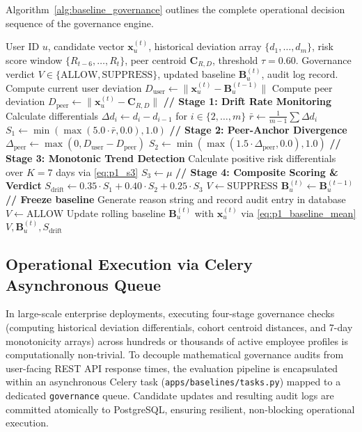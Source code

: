 \documentclass[conference]{IEEEtran}
\begin{document}
Algorithm~\ref{alg:baseline_governance} outlines the complete operational decision sequence of the governance engine.

\begin{algorithm}[t]
\caption{Four-Stage Baseline Update Governance Algorithm}
\label{alg:baseline_governance}
\begin{algorithmic}[1]
\REQUIRE User ID $u$, candidate vector $\mathbf{x}_u^{(t)}$, historical deviation array $\{d_1, \dots, d_m\}$, risk score window $\{R_{t-6}, \dots, R_t\}$, peer centroid $\mathbf{C}_{R,D}$, threshold $\tau = 0.60$.
\ENSURE Governance verdict $V \in \{\text{ALLOW}, \text{SUPPRESS}\}$, updated baseline $\mathbf{B}_u^{(t)}$, audit log record.
\STATE Compute current user deviation $D_{\text{user}} \leftarrow \|\mathbf{x}_u^{(t)} - \mathbf{B}_u^{(t-1)}\|$
\STATE Compute peer deviation $D_{\text{peer}} \leftarrow \|\mathbf{x}_u^{(t)} - \mathbf{C}_{R,D}\|$
\STATE \textbf{// Stage 1: Drift Rate Monitoring}
\STATE Calculate differentials $\Delta d_i \leftarrow d_i - d_{i-1}$ for $i \in \{2, \dots, m\}$
\STATE $\bar{r} \leftarrow \frac{1}{m-1} \sum \Delta d_i$
\STATE $S_1 \leftarrow \min(\max(5.0 \cdot \bar{r}, 0.0), 1.0)$
\STATE \textbf{// Stage 2: Peer-Anchor Divergence}
\STATE $\Delta_{\text{peer}} \leftarrow \max(0, D_{\text{user}} - D_{\text{peer}})$
\STATE $S_2 \leftarrow \min(\max(1.5 \cdot \Delta_{\text{peer}}, 0.0), 1.0)$
\STATE \textbf{// Stage 3: Monotonic Trend Detection}
\STATE Calculate positive risk differentials over $K=7$ days via \eqref{eq:p1_s3}
\STATE $S_3 \leftarrow \mu$
\STATE \textbf{// Stage 4: Composite Scoring \& Verdict}
\STATE $S_{\text{drift}} \leftarrow 0.35 \cdot S_1 + 0.40 \cdot S_2 + 0.25 \cdot S_3$
    \STATE $V \leftarrow \text{SUPPRESS}$
    \STATE $\mathbf{B}_u^{(t)} \leftarrow \mathbf{B}_u^{(t-1)}$ \textbf{// Freeze baseline}
    \STATE Generate reason string and record audit entry in database
\ELSE
    \STATE $V \leftarrow \text{ALLOW}$
    \STATE Update rolling baseline $\mathbf{B}_u^{(t)}$ with $\mathbf{x}_u^{(t)}$ via \eqref{eq:p1_baseline_mean}
\ENDIF
\RETURN $V, \mathbf{B}_u^{(t)}, S_{\text{drift}}$
\end{algorithmic}
\end{algorithm}

\subsection{Operational Execution via Celery Asynchronous Queue}
In large-scale enterprise deployments, executing four-stage governance checks (computing historical deviation differentials, cohort centroid distances, and 7-day monotonicity arrays) across hundreds or thousands of active employee profiles is computationally non-trivial. To decouple mathematical governance audits from user-facing REST API response times, the evaluation pipeline is encapsulated within an asynchronous Celery task (\texttt{apps/baselines/tasks.py}) mapped to a dedicated \texttt{governance} queue. Candidate updates and resulting audit logs are committed atomically to PostgreSQL, ensuring resilient, non-blocking operational execution.
\end{document}

